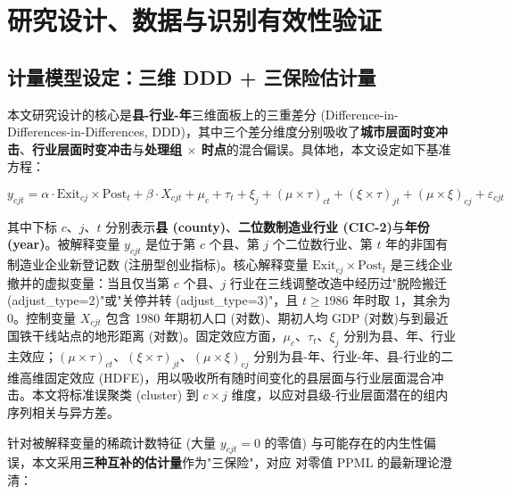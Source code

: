 \section{研究设计、数据与识别有效性验证}\label{sec:strategy}

\subsection{计量模型设定：三维 DDD + 三保险估计量}\label{sec:strategy:model}

本文研究设计的核心是\textbf{县-行业-年}三维面板上的三重差分 (Difference-in-Differences-in-Differences, DDD)，其中三个差分维度分别吸收了\textbf{城市层面时变冲击}、\textbf{行业层面时变冲击}与\textbf{处理组 $\times$ 时点}的混合偏误。具体地，本文设定如下基准方程：

\begin{equation}\label{eq:main}
y_{cjt} = \alpha \cdot \mathrm{Exit}_{cj} \times \mathrm{Post}_t + \beta \cdot X_{cjt} + \mu_c + \tau_t + \xi_j + (\mu \times \tau)_{ct} + (\xi \times \tau)_{jt} + (\mu \times \xi)_{cj} + \varepsilon_{cjt}
\end{equation}

其中下标 $c$、$j$、$t$ 分别表示\textbf{县 (county)}、\textbf{二位数制造业行业 (CIC-2)}与\textbf{年份 (year)}。被解释变量 $y_{cjt}$ 是位于第 $c$ 个县、第 $j$ 个二位数行业、第 $t$ 年的非国有制造业企业新登记数 (注册型创业指标)。核心解释变量 $\mathrm{Exit}_{cj} \times \mathrm{Post}_t$ 是三线企业撤并的虚拟变量：当且仅当第 $c$ 个县、$j$ 行业在三线调整改造中经历过"脱险搬迁 (adjust\_type=2)"或"关停并转 (adjust\_type=3)"，且 $t \geq 1986$ 年时取 1，其余为 0。控制变量 $X_{cjt}$ 包含 1980 年期初人口 (对数)、期初人均 GDP (对数)与到最近国铁干线站点的地形距离 (对数)。固定效应方面，$\mu_c$、$\tau_t$、$\xi_j$ 分别为县、年、行业主效应；$(\mu \times \tau)_{ct}$、$(\xi \times \tau)_{jt}$、$(\mu \times \xi)_{cj}$ 分别为县-年、行业-年、县-行业的二维高维固定效应 (HDFE)，用以吸收所有随时间变化的县层面与行业层面混合冲击。本文将标准误聚类 (cluster) 到 $c \times j$ 维度，以应对县级-行业层面潜在的组内序列相关与异方差。

针对被解释变量的稀疏计数特征 (大量 $y_{cjt}=0$ 的零值) 与可能存在的内生性偏误，本文采用\textbf{三种互补的估计量}作为"三保险"，对应 \citet{chen2024} 对零值 PPML 的最新理论澄清：

